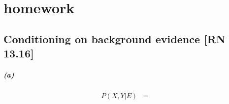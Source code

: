 \documentclass[utf-8, a4paper]{article}
\begin{document}
	\section{homework}
	\subsection{Conditioning on background evidence [RN 13.16]}
	\subparagraph{(a)}
	\begin{eqnarray}
	P(X,Y|E) &=&
	 
	\end{eqnarray}
\end{document}
